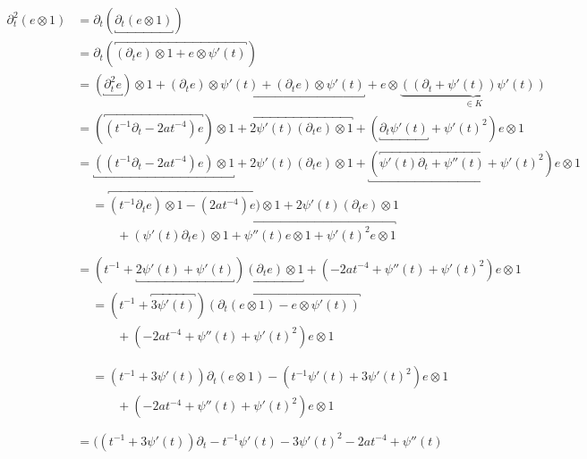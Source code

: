 \begin{try}
\begin{align*}
\partial_t^2(e\otimes 1) &= \partial_t(\underbracket{\partial_t(e\otimes 1)})\\
  &= \partial_t(\overbracket{(\partial_te)\otimes 1
    + e\otimes \psi'(t)})\\
  &= (\underbracket{\partial_t^2 e})\otimes 1
    + \underbracket{(\partial_t e)\otimes \psi'(t)
    +               (\partial_t e)\otimes \psi'(t)}
    + e\otimes\underset{\in K}{\underbrace{((\partial_t+\psi'(t))\psi'(t))}}\\
  &= (\overbracket{(t^{-1}\partial_t - 2at^{-4}) e})\otimes 1
    + \overbracket{2\psi'(t) (\partial_t e)\otimes 1}
    + (\underbracket{\partial_t\psi'(t)} + \psi'(t)^2)e\otimes 1\\
  &= \underbracket{((t^{-1}\partial_t - 2at^{-4}) e)\otimes 1}
    + 2\psi'(t) (\partial_t e)\otimes 1
    + \underbracket{(\overbracket{\psi'(t)\partial_t + \psi''(t)} +
    \psi'(t)^2)e\otimes 1}\\
  &\begin{aligned}
    &= \overbracket{
        (t^{-1}\partial_t e)\otimes 1
        - (2at^{-4}) e)\otimes 1
      }
      + 2\psi'(t) (\partial_t e)\otimes 1\\
    &\qquad + \overbracket{
        (\psi'(t)\partial_t e)\otimes 1
        + \psi''(t) e\otimes 1
        + \psi'(t)^2 e\otimes 1
      }\\
  \end{aligned} \\
  &= (t^{-1} + \underbracket{2\psi'(t) + \psi'(t)})
    \underbracket{(\partial_t e)\otimes 1}
    + (- 2at^{-4} + \psi''(t) + \psi'(t)^2) e\otimes 1 \\
  &\begin{aligned}
    &= (t^{-1} + \overbracket{3\psi'(t)})\overbracket{(\partial_t (e\otimes 1)
    - e\otimes \psi'(t))}\\
    &\qquad + (- 2at^{-4} + \psi''(t) + \psi'(t)^2) e\otimes 1 \\
  \end{aligned} \\
  &\begin{aligned}
    &= (t^{-1} + 3\psi'(t))\partial_t (e\otimes 1)
    - (t^{-1} \psi'(t) + 3\psi'(t)^2)e\otimes 1\\
    &\qquad + (- 2at^{-4} + \psi''(t) + \psi'(t)^2) e\otimes 1 \\
  \end{aligned} \\
  &= \Big((t^{-1} + 3\psi'(t))\partial_t
    - t^{-1} \psi'(t) - 3\psi'(t)^2 - 2at^{-4} + \psi''(t)

\end{align*}
\end{try}
